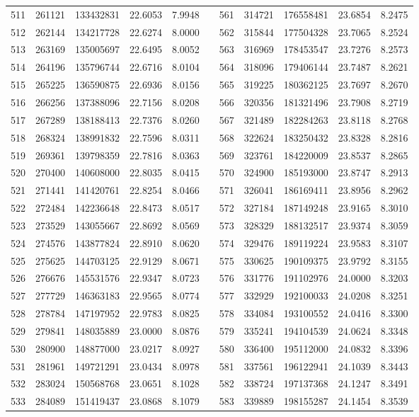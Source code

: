 \begin{longtable}{rrrrrrrrrrr}
511&261121&133432831&22.6053&7.9948&&561&314721&176558481&23.6854&8.2475\\
512&262144&134217728&22.6274&8.0000&&562&315844&177504328&23.7065&8.2524\\
513&263169&135005697&22.6495&8.0052&&563&316969&178453547&23.7276&8.2573\\
514&264196&135796744&22.6716&8.0104&&564&318096&179406144&23.7487&8.2621\\
515&265225&136590875&22.6936&8.0156&&565&319225&180362125&23.7697&8.2670\\
516&266256&137388096&22.7156&8.0208&&566&320356&181321496&23.7908&8.2719\\
517&267289&138188413&22.7376&8.0260&&567&321489&182284263&23.8118&8.2768\\
518&268324&138991832&22.7596&8.0311&&568&322624&183250432&23.8328&8.2816\\
519&269361&139798359&22.7816&8.0363&&569&323761&184220009&23.8537&8.2865\\
520&270400&140608000&22.8035&8.0415&&570&324900&185193000&23.8747&8.2913\\
521&271441&141420761&22.8254&8.0466&&571&326041&186169411&23.8956&8.2962\\
522&272484&142236648&22.8473&8.0517&&572&327184&187149248&23.9165&8.3010\\
523&273529&143055667&22.8692&8.0569&&573&328329&188132517&23.9374&8.3059\\
524&274576&143877824&22.8910&8.0620&&574&329476&189119224&23.9583&8.3107\\
525&275625&144703125&22.9129&8.0671&&575&330625&190109375&23.9792&8.3155\\
526&276676&145531576&22.9347&8.0723&&576&331776&191102976&24.0000&8.3203\\
527&277729&146363183&22.9565&8.0774&&577&332929&192100033&24.0208&8.3251\\
528&278784&147197952&22.9783&8.0825&&578&334084&193100552&24.0416&8.3300\\
529&279841&148035889&23.0000&8.0876&&579&335241&194104539&24.0624&8.3348\\
530&280900&148877000&23.0217&8.0927&&580&336400&195112000&24.0832&8.3396\\
531&281961&149721291&23.0434&8.0978&&581&337561&196122941&24.1039&8.3443\\
532&283024&150568768&23.0651&8.1028&&582&338724&197137368&24.1247&8.3491\\
533&284089&151419437&23.0868&8.1079&&583&339889&198155287&24.1454&8.3539\\

\end{longtable}
